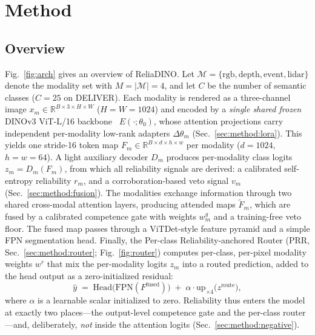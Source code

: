 
\section{Method}
\label{sec:method}

\subsection{Overview}
\label{sec:method:overview}

Fig.~\ref{fig:arch} gives an overview of ReliaDINO. Let
$\mathcal{M}=\{\mathrm{rgb},\mathrm{depth},\mathrm{event},\mathrm{lidar}\}$
denote the modality set with $M=|\mathcal{M}|=4$, and let $C$ be the number of
semantic classes ($C{=}25$ on DELIVER). Each modality is rendered as a
three-channel image $x_m\in\mathbb{R}^{B\times 3\times H\times W}$
($H{=}W{=}1024$) and encoded by a \emph{single shared frozen} DINOv3
ViT-L/16 backbone~\cite{dinov3_2025} $E(\cdot;\theta_0)$, whose attention
projections carry independent per-modality low-rank adapters
$\Delta\theta_m$ (Sec.~\ref{sec:method:lora}). This yields one stride-16
token map $F_m\in\mathbb{R}^{B\times d\times h\times w}$ per modality
($d{=}1024$, $h{=}w{=}64$). A light auxiliary decoder $D_m$ produces
per-modality class logits $z_m=D_m(F_m)$, from which all reliability signals
are derived: a calibrated self-entropy reliability $r_m$, and a
corroboration-based veto signal $v_m$ (Sec.~\ref{sec:method:fusion}).
The modalities exchange information through two shared cross-modal attention
layers, producing attended maps $\tilde F_m$, which are fused by a calibrated
competence gate with weights $w^{g}_m$ and a training-free veto floor. The
fused map passes through a ViTDet-style feature
pyramid and a simple FPN segmentation head. Finally, the
Per-class Reliability-anchored Router (PRR, Sec.~\ref{sec:method:router};
Fig.~\ref{fig:router}) computes per-class, per-pixel modality weights
$w^{r}$ that mix the per-modality logits $z_m$ into a routed prediction,
added to the head output as a zero-initialized residual:
\begin{equation}
\hat y \;=\; \mathrm{Head}\big(\mathrm{FPN}(F^{\mathrm{fused}})\big)
\;+\; \alpha\cdot \mathrm{up}_{\times 4}\!\big(z^{\mathrm{route}}\big),
\label{eq:overview}
\end{equation}
where $\alpha$ is a learnable scalar initialized to zero. Reliability thus
enters the model at exactly two places---the output-level competence gate and
the per-class router---and, deliberately, \emph{not} inside the attention
logits (Sec.~\ref{sec:method:negative}).

